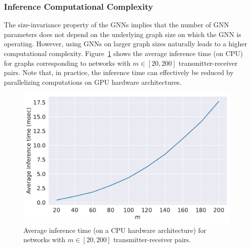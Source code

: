 \documentclass[lettersize,journal]{IEEEtran}
\begin{document}
\subsubsection{Inference Computational Complexity}
The size-invariance property of the GNNs implies that the number of GNN parameters does not depend on the underlying graph size on which the GNN is operating. However, using GNNs on larger graph sizes naturally leads to a higher computational complexity. Figure~\ref{fig:inference_time_vs_m} shows the average inference time (on CPU) for graphs corresponding to networks with $m\in[20, 200]$ transmitter-receiver pairs. Note that, in practice, the inference time can effectively be reduced by parallelizing computations on GPU hardware architectures.

\begin{figure}[t!]
\centering
\includegraphics[width=.97\columnwidth]{fig_inference_time_vs_m.pdf}
\caption{Average inference time (on a CPU hardware architecture) for networks with $m\in[20,200]$ transmitter-receiver pairs.}
\label{fig:inference_time_vs_m}
\end{figure}
\end{document}
